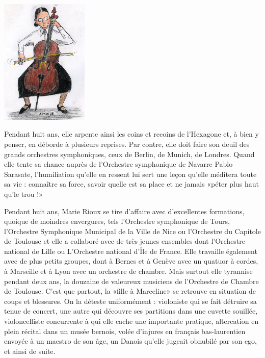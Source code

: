 \begin{floatingfigure}[l]{45mm}
\includegraphics[height=60mm]{corps/chapitre16/img/personnage-marie-musique.jpg}
\end{floatingfigure}

Pendant huit ans, elle arpente ainsi les coins et recoins de l’Hexagone et, à bien y penser, en déborde à plusieurs reprises. Par contre, elle doit faire son deuil des grands orchestres symphoniques, ceux de Berlin, de Munich, de Londres. Quand elle tente sa chance auprès de l’Orchestre symphonique de Navarre Pablo Sarasate, l’humiliation qu’elle en ressent lui sert une leçon qu’elle méditera toute sa vie : connaître sa force, savoir quelle est sa place et ne jamais «péter plus haut qu’le trou !»

Pendant huit ans, Marie Rioux se tire d’affaire avec d’excellentes formations, quoique de moindres envergures, tels l’Orchestre symphonique de Tours, l’Orchestre Symphonique Municipal de la Ville de Nice ou l’Orchestre du Capitole de Toulouse et elle a collaboré avec de très jeunes ensembles dont l’Orchestre national de Lille ou L’Orchestre national d’Île de France. Elle travaille également avec de plus petits groupes, dont à Bernes et à Genève avec un quatuor à cordes, à Marseille et à Lyon avec un orchestre de chambre. Mais surtout elle tyrannise pendant deux ans, la douzaine de valeureux musiciens de l’Orchestre de Chambre de Toulouse. C’est que partout, la «fille à Marceline» se retrouve en situation de coups et blessures. On la déteste uniformément : violoniste qui se fait détruire sa tenue de concert, une autre qui découvre ses partitions dans une cuvette souillée, violoncelliste concurrente à qui elle cache une importante pratique, altercation en plein récital dans un musée bernois, volée d’injures en français bas-laurentien envoyée à un maestro de son âge, un Danois qu’elle jugeait obnubilé par son ego, et ainsi de suite.

